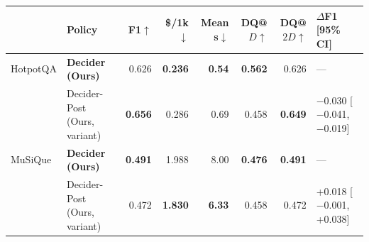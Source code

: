 \begin{tabular}{@{}llrrrrrl@{}}
\toprule
 & Policy & F1$\uparrow$ & \$/1k$\downarrow$ & Mean s$\downarrow$ & DQ@$D$$\uparrow$ & DQ@$2D$$\uparrow$ & $\Delta$F1 [95\% CI]\\
\midrule
HotpotQA & \textbf{Decider (Ours)} & 0.626 & \textbf{0.236} & \textbf{0.54} & \textbf{0.562} & 0.626 & ---\\
 & Decider-Post (Ours, variant) & \textbf{0.656} & 0.286 & 0.69 & 0.458 & \textbf{0.649} & $-$0.030 [$-$0.041, $-$0.019]\\
MuSiQue & \textbf{Decider (Ours)} & \textbf{0.491} & 1.988 & 8.00 & \textbf{0.476} & \textbf{0.491} & ---\\
 & Decider-Post (Ours, variant) & 0.472 & \textbf{1.830} & \textbf{6.33} & 0.458 & 0.472 & +0.018 [$-$0.001, +0.038]\\
\bottomrule
\end{tabular}
